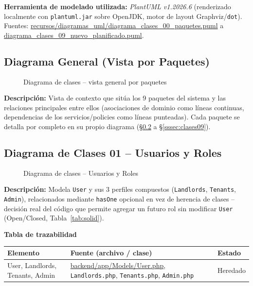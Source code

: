 \bigskip
{\sloppy\noindent\textbf{Herramienta de modelado utilizada:} \textit{PlantUML v1.2026.6} (renderizado localmente con \texttt{plantuml.jar} sobre OpenJDK, motor de layout Graphviz/\texttt{dot}). Fuentes: \url{recursos/diagramas_uml/diagrama_clases_00_paquetes.puml} a \url{diagrama_clases_09_nuevo_planificado.puml}.\par}
\clearpage

\subsection{Diagrama General (Vista por Paquetes)}
\begin{figure}[H]
    \centering
    \caption{Diagrama de clases -- vista general por paquetes}
    \label{fig:clases00}
\end{figure}
\noindent\textbf{Descripción:} Vista de contexto que sitúa los 9 paquetes del sistema y las relaciones principales entre ellos (asociaciones de dominio como líneas continuas, dependencias de los servicios/policies como líneas punteadas). Cada paquete se detalla por completo en su propio diagrama (\S\ref{sssec:clases01} a \S\ref{sssec:clases09}).
\clearpage

\subsection{Diagrama de Clases 01 -- Usuarios y Roles}
\label{sssec:clases01}
\begin{figure}[H]
    \centering
    \caption{Diagrama de clases -- Usuarios y Roles}
    \label{fig:clases01}
\end{figure}
\noindent\textbf{Descripción:} Modela \texttt{User} y sus 3 perfiles compuestos (\texttt{Landlords}, \texttt{Tenants}, \texttt{Admin}), relacionados mediante \texttt{hasOne} opcional en vez de herencia de clases -- decisión real del código que permite agregar un futuro rol sin modificar \texttt{User} (Open/Closed, Tabla~\ref{tab:solid}).

\bigskip
\noindent\textbf{Tabla de trazabilidad}
\begin{longtable}{|L{5.5cm}|L{7.5cm}|M{2cm}|}
\hline
{} \textbf{Elemento} & \textbf{Fuente (archivo / clase)} & \textbf{Estado} \\ \hline
\endhead
User, Landlords, Tenants, Admin & \url{backend/app/Models/User.php}, \texttt{Landlords.php}, \texttt{Tenants.php}, \texttt{Admin.php} & Heredado \\ \hline
\end{longtable}
\clearpage

